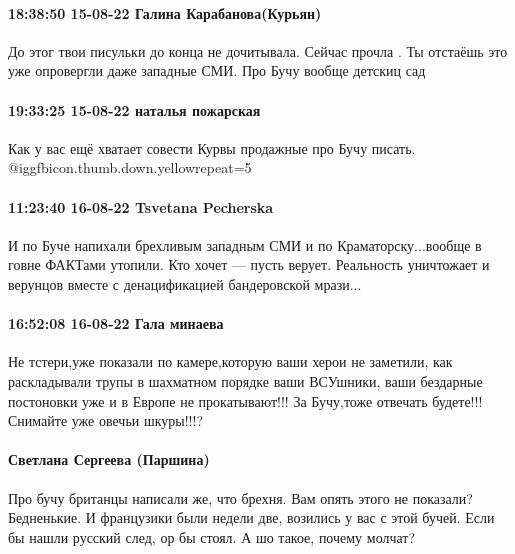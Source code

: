  
 
 
 
 

\paragraph{18:38:50 15-08-22 Галина Карабанова(Курьян)}

До этог твои писульки до конца не дочитывала. Сейчас прочла . Ты отстаёшь это
уже опровергли даже западные СМИ. Про Бучу вообще детскиц сад

\paragraph{19:33:25 15-08-22 наталья пожарская}

Как у вас ещё хватает совести Курвы продажные про Бучу писать. @igg{fbicon.thumb.down.yellow}{repeat=5} 

\paragraph{11:23:40 16-08-22 Tsvetana Pecherska}

\obeycr
И по Буче напихали брехливым западным СМИ и по Краматорску...вообще в говне ФАКТами утопили.
Кто хочет — пусть верует.
Реальность уничтожает и верунцов вместе с денацификацией бандеровской мрази...
\restorecr

\paragraph{16:52:08 16-08-22 Гала минаева}

Не тстери,уже показали по камере,которую ваши херои не заметили, как
раскладывали трупы в шахматном порядке ваши ВСУшники, ваши бездарные постоновки
уже и в Европе не прокатывают!!! За Бучу,тоже отвечать будете!!! Снимайте уже
овечьи шкуры!!!?

\paragraph{Светлана Сергеева (Паршина)}

Про бучу британцы написали же, что брехня. Вам опять этого не показали?
Бедненькие. И французики были недели две, возились у вас с этой бучей. Если бы
нашли русский след, ор бы стоял. А шо такое, почему молчат?
